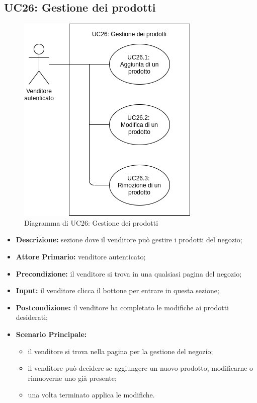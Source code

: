 \subsection{UC26: Gestione dei prodotti}
\label{sec:UC26}
\begin{figure}[!ht]
    \caption{Diagramma di UC26: Gestione dei prodotti}
    \vspace{10px}
    \includegraphics[scale=0.5]{../../../Images/AnalisiRequisiti/UC26}
    \centering
\end{figure}
\begin{itemize}
    \item \textbf{Descrizione:} sezione dove il venditore può gestire i prodotti del negozio;
    \item \textbf{Attore Primario:} venditore autenticato;
    \item \textbf{Precondizione:} il venditore si trova in una qualsiasi pagina del negozio;
    \item \textbf{Input:} il venditore clicca il bottone per entrare in questa sezione;
    \item \textbf{Postcondizione:} il venditore ha completato le modifiche ai prodotti desiderati;
    \item \textbf{Scenario Principale:}
          \begin{itemize}
              \item il venditore si trova nella pagina per la gestione del negozio;
              \item il venditore può decidere se aggiungere un nuovo prodotto, modificarne o rimuoverne uno già presente;
              \item una volta terminato applica le modifiche.
          \end{itemize}
\end{itemize}
